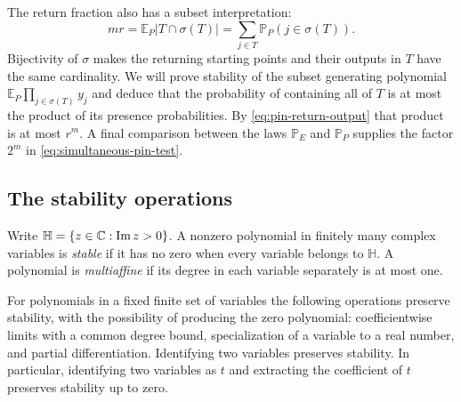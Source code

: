 The return fraction also has a subset interpretation:
\begin{equation}\label{eq:pin-return-output}
 mr=\mathbb E_P|T\cap\sigma(T)|
                  =\sum_{j\in T}\mathbb P_P(j\in\sigma(T)).
\end{equation}
Bijectivity of $\sigma$ makes the returning starting points and their
outputs in $T$ have the same cardinality.  We will prove stability
of the subset generating polynomial
$\mathbb E_P\prod_{j\in\sigma(T)}y_j$ and deduce that the probability
of containing all of $T$ is at most the product of its presence
probabilities.  By \eqref{eq:pin-return-output} that product is at most
$r^m$.  A final comparison between the laws $\mathbb P_E$ and
$\mathbb P_P$ supplies the factor $2^m$ in
\eqref{eq:simultaneous-pin-test}.

\subsection{The stability operations}

Write $\mathbb H=\{z\in\mathbb C:\operatorname{Im}z>0\}$.
A nonzero polynomial in finitely many complex variables is
\emph{stable} if it has no zero when every variable belongs to
$\mathbb H$.  A polynomial is \emph{multiaffine} if its degree in
each variable separately is at most one.

\begin{lemma}\label{lem:pin-stability-closure}
For polynomials in a fixed finite set of variables the following
operations preserve stability, with the possibility of producing the
zero polynomial: coefficientwise limits with a common degree bound,
specialization of a variable to a real number, and partial differentiation.
Identifying two variables preserves stability.  In particular, identifying
two variables as $t$ and extracting the coefficient of $t$ preserves
stability up to zero.
\end{lemma}

